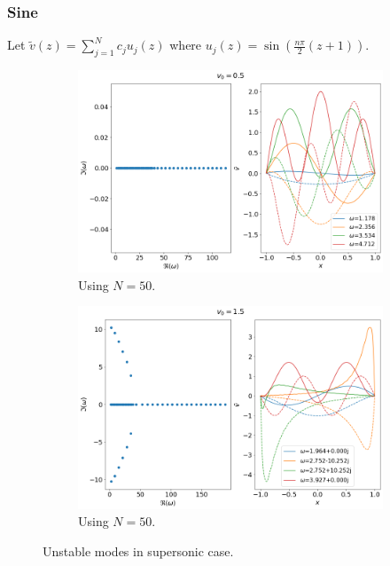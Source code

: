 \documentclass{article}
\begin{document}
\subsubsection{Sine}
Let $ \tilde{v}(z) = \sum_{j=1}^{N} c_ju_j(z) $ where $u_j(z)=\sin(\frac{n\pi}{2}(z+1))$.
\begin{figure}[H]
    \centering
    \begin{subfigure}[b]{0.45\linewidth}
        \includegraphics[width=\linewidth]{img/results-sine-N=50,v0=0.5.png}
        \caption{Using $N=50$.}
    \end{subfigure}%
    \begin{subfigure}[b]{0.45\linewidth}
        \includegraphics[width=\linewidth]{img/results-sine-N=50,v0=1.5.png}
        \caption{Using $N=50$.}
    \end{subfigure}
    \caption{Unstable modes in supersonic case.}
    \label{fig:results-sine}
\end{figure}
\end{document}

